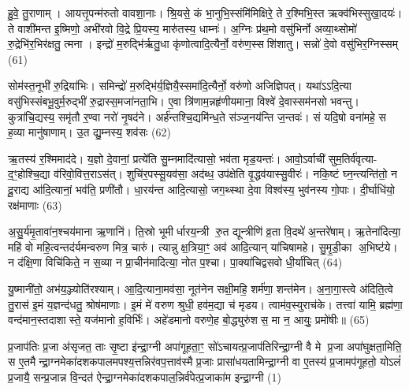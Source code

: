 हु॒वे॒ तु॒राणाम्। आयत्तृ॒पन्म॑रुतो वावशा॒नाः। श्रि॒यसे॒ कं भा॒नुभि॒स्संमि॑मिक्षिरे॒ ते र॒श्मिभि॒स्त ऋक्व॑भिस्सुखा॒दयः॑। ते वाशी॑मन्त इ॒ष्मिणो॒ अभी॑रवो वि॒द्रे प्रि॒यस्य॒ मारु॑तस्य॒ धाम्नः॑। अ॒ग्निः प्र॑थ॒मो वसु॑भिर्नो अव्या॒थ्सोमो॑ रु॒द्रेभि॑र॒भिर॑क्षतु॒ त्मना। इन्द्रो॑ म॒रुद्भि॑र्\mbox{}ऋतु॒धा कृ॑णोत्वादि॒त्यैर्नो॒ वरु॑ण॒स्सशि॑शातु। सन्नो॑ दे॒वो वसु॑भिर॒ग्निस्सम् (61)

सोम॑स्त॒नूभी॑ रु॒द्रिया॑भिः। समिन्द्रो॑ म॒रुद्भि॑र्य॒ज्ञियै॒स्समा॑दि॒त्यैर्नो॒ वरु॑णो अजिज्ञिपत्। यथा॑ऽऽदि॒त्या वसु॑भिस्संबभू॒वुर्म॒रुद्भी॑ रु॒द्रास्स॒मजा॑नता॒भि। ए॒वा त्रि॑णाम॒न्नहृ॑णीयमाना॒ विश्वे॑ दे॒वास्सम॑नसो भवन्तु। कुत्रा॑चि॒द्यस्य॒ समृ॑तौ र॒ण्वा नरो॑ नृ॒षद॑ने। अर्\mbox{}ह॑न्तश्चि॒द्यमि॑न्ध॒ते स॑ञ्ज॒नय॑न्ति ज॒न्तवः॑। सं यदि॒षो वना॑महे॒ स ह॒व्या मानु॑षाणाम्। उ॒त द्यु॒म्नस्य॒ शव॑सः (62)

ऋ॒तस्य॑ र॒श्मिमाद॑दे। य॒ज्ञो दे॒वानां॒ प्रत्ये॑ति सु॒म्नमादि॑त्यासो॒ भव॑ता मृड॒यन्तः॑। आवो॒ऽर्वाची॑ सुम॒तिर्व॑वृत्या- द॒ꣳ॒होश्चि॒द्या व॑रिवो॒वित्त॒राऽस॑त्। शुचि॑र॒पस्सू॒यव॑सा॒ अद॑ब्ध॒ उप॑क्षेति वृ॒द्धव॑यास्सु॒वीरः॑। नकि॒ष्टं घ्न॒न्त्यन्ति॑तो॒ न दू॒राद्य आ॑दि॒त्यानां॒ भव॑ति॒ प्रणी॑तौ। धा॒रय॑न्त आदि॒त्यासो॒ जग॒थ्स्था दे॒वा विश्व॑स्य॒ भुव॑नस्य गो॒पाः। दी॒र्घाधि॑यो॒ रक्ष॑माणाः (63)

अ॒सु॒र्य॑मृ॒तावा॑न॒श्चय॑माना ऋ॒णानि॑। ति॒स्रो भूमीर्धारय॒न्त्री रु॒त द्यून्त्रीणि॑ व्र॒ता वि॒दथे॑ अ॒न्तरे॑षाम्। ऋ॒तेना॑दित्या॒ महि॑ वो महि॒त्वन्तद॑र्यमन्वरुण मित्र॒ चारु॑। त्यान्नु क्ष॒त्रिया॒ꣳ॒ अव॑ आदि॒त्यान् या॑चिषामहे। सु॒मृ॒डी॒का अ॒भिष्ट॑ये। न द॑क्षि॒णा विचि॑किते॒ न स॒व्या न प्रा॒चीन॑मादित्या॒ नोत प॒श्चा। पा॒क्या॑चिद्वसवो धी॒र्या॑चित् (64)

यु॒ष्मानी॑तो॒ अभ॑य॒ञ्ज्योति॑रश्याम्। आ॒दि॒त्याना॒मव॑सा॒ नूत॑नेन सक्षी॒महि॒ शर्म॑णा॒ शन्त॑मेन। अ॒ना॒गा॒स्त्वे अ॑दिति॒त्वे तु॒रास॑ इ॒मं य॒ज्ञन्द॑धतु॒ श्रोष॑माणाः। इ॒मं मे॑ वरुण श्रुधी॒ हव॑म॒द्या च॑ मृडय। त्वाम॑व॒स्युराच॑के। तत्त्वा॑ यामि॒ ब्रह्म॑णा॒ वन्द॑मान॒स्तदाशास्ते॒ यज॑मानो ह॒विर्भिः॑। अहे॑डमानो वरुणे॒ह बो॒द्ध्युरु॑शस॒ मा न॒ आयुः॒ प्रमो॑षीः॥ (65)


{\anuvakamend[{नामा॒ग्निस्स शव॑सो॒ रक्ष॑माणा धी॒र्या॑चि॒देका॒न्नप॑ञ्चा॒शच्च॑॥11॥}]}

\setcounter{anuvakam}{0}
प्र॒जाप॑तिः प्र॒जा अ॑सृजत॒ ताः सृ॒ष्टा इ॑न्द्रा॒ग्नी अपा॑गूहता॒ꣳ॒ सो॑ऽचायत्प्र॒जाप॑तिरिन्द्रा॒ग्नी वै मे प्र॒जा अपा॑घुक्षता॒मिति॒ स ए॒तमैन्द्रा॒ग्नमेका॑दशकपालमपश्य॒त्तन्निर॑वप॒त्ताव॑स्मै प्र॒जाः प्रासा॑धयतामिन्द्रा॒ग्नी वा ए॒तस्य॑ प्र॒जामप॑गूहतो॒ योऽलं॑ प्र॒जायै॒ सन्प्र॒जान्न वि॒न्दत॑ ऐन्द्रा॒ग्नमेका॑दशकपाल॒न्निर्व॑पेत्प्र॒जाका॑म इन्द्रा॒ग्नी (1)

